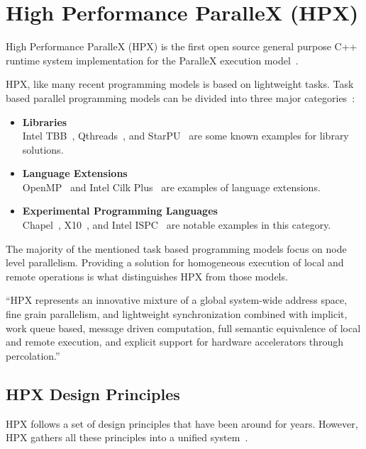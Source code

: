 \section{High Performance ParalleX (HPX)}
\label{sec:hpx}
High Performance ParalleX (HPX) is the first open source general purpose C++ runtime system implementation for the ParalleX execution model~\cite{huck2013early,kaiser2014hpx}.

HPX, like many recent programming models is based on lightweight tasks. Task based parallel programming models can be divided into three major categories~\cite{kaiser2014hpx,podobas2010comparison}:

\begin{itemize}
  \item \textbf{Libraries}\\
    Intel TBB~\cite{pheatt2008intel}, Qthreads~\cite{wheeler2008qthreads}, and StarPU~\cite{augonnet2011starpu} are some known examples for library solutions.
  \item \textbf{Language Extensions}\\
    OpenMP~\cite{dagum1998openmp} and Intel Cilk Plus~\cite{robison2012cilk} are examples of language extensions.
  \item \textbf{Experimental Programming Languages}\\
    Chapel~\cite{chamberlain2007parallel}, X10~\cite{pharr2012ispc}, and Intel ISPC~\cite{pharr2012ispc} are notable examples in this category.
\end{itemize}

The majority of the mentioned task based programming models focus on node level parallelism. Providing a solution for homogeneous execution of local and remote operations is what distinguishes HPX from those models.

``HPX represents an innovative mixture of a global system-wide address space, fine grain parallelism, and lightweight synchronization combined with implicit, work queue based, message driven computation, full semantic equivalence of local and remote execution, and explicit support for hardware accelerators
through percolation.''~\cite{kaiser2014hpx}

\subsection{HPX Design Principles}
HPX follows a set of design principles that have been around for years. However, HPX gathers all these principles into a unified system~\cite{kaiser2014hpx}.

